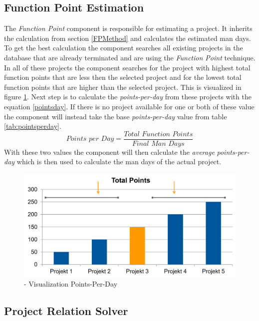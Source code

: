 \subsection{Function Point Estimation}\label{functionpointconcept}

The \textit{Function Point} component is responsible for estimating a project. It inherits the calculation from section \ref{FPMethod} and calculates the estimated man days. To get the best calculation the component searches all existing projects in the database that are already terminated and are using the \textit{Function Point} technique. In all of these projects the component searches for the project with highest total function points that are less then the selected project and for the lowest total function points that are higher than the selected project. This is visualized in figure \ref{fig:pointsperday}. Next step is to calculate the \textit{points-per-day} from these projects with the equation \ref{pointsday}. If there is no project available for one or both of these value the component will instead take the base \textit{points-per-day} value from table \ref{tab:pointsperday}.
\begin{equation}
\textit{Points per Day} =  \frac{\textit{Total Function Points}}{\textit{Final Man Days}}\label{pointsday}
\end{equation}
With these two values the component will then calculate the \textit{average} \textit{points-per-day} which is then used to calculate the man days of the actual project.
\begin{figure}[h] 
	\centering 
	\includegraphics[width=14cm]{images/pointsperday.png} 
	\caption{- Visualization Points-Per-Day} 
	\label{fig:pointsperday}
\end{figure}
\subsection{Project Relation Solver}\label{projectRealtionSolver}

